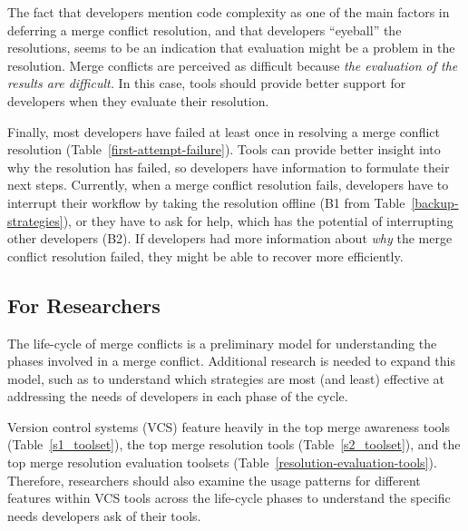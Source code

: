 The fact that developers mention code complexity as one of the main factors in deferring a merge conflict resolution, and that developers ``eyeball'' the resolutions, seems to be an indication that evaluation might be a problem in the resolution.
Merge conflicts are perceived as difficult because \emph{the evaluation of the results are difficult.}
In this case, tools should provide better support for developers when they evaluate their resolution.

Finally, most developers have failed at least once in resolving a merge conflict resolution (Table~\ref{first-attempt-failure}).
Tools can provide better insight into why the resolution has failed, so developers have information to formulate their next steps.
Currently, when a merge conflict resolution fails, developers have to interrupt their workflow by taking the resolution offline (B1 from Table~\ref{backup-strategies}), or they have to ask for help, which has the potential of interrupting other developers (B2).
If developers had more information about \emph{why} the merge conflict resolution failed, they might be able to recover more efficiently.

\subsection{For Researchers}
The life-cycle of merge conflicts is a preliminary model for understanding the phases involved in a merge conflict.
Additional research is needed to expand this model, such as to understand which strategies are most (and least) effective at addressing the needs of developers in each phase of the cycle.

Version control systems (VCS) feature heavily in the top merge awareness tools (Table~\ref{s1_toolset}), the top merge resolution tools (Table~\ref{s2_toolset}), and the top merge resolution evaluation toolsets (Table~\ref{resolution-evaluation-tools}).
Therefore, researchers should also examine the usage patterns for different features within VCS tools across the life-cycle phases to understand the specific needs developers ask of their tools.

